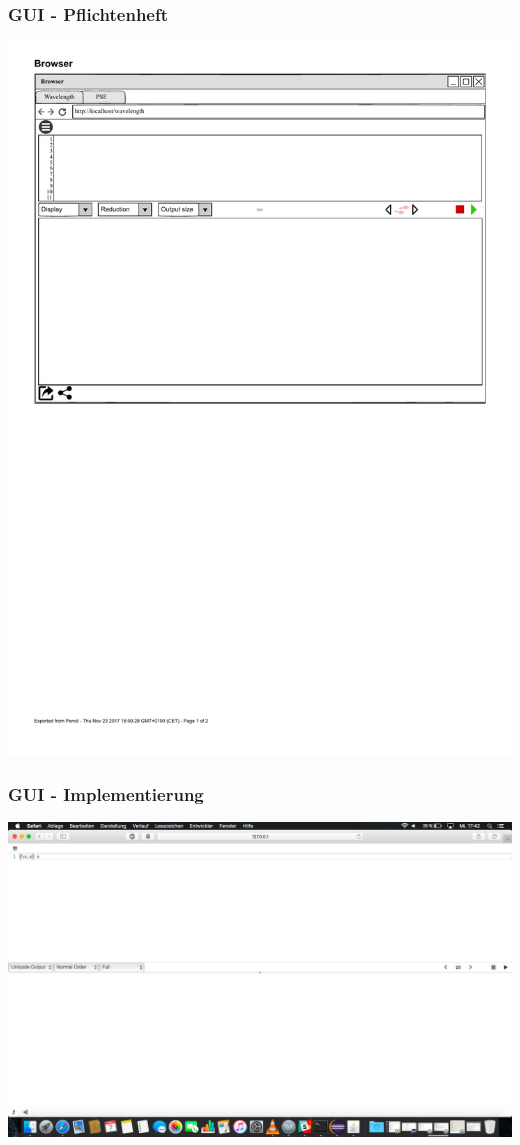 \documentclass[10pt]{beamer}
\begin{document}
\begin{frame}
\frametitle{GUI - \alert{Pflichtenheft}}
\includegraphics[scale=0.55]{img/startseite.pdf}
\end{frame}

\begin{frame}
\frametitle{GUI - \alert{Implementierung}}
\hspace*{-1cm}
\includegraphics[trim={0, 2.2cm, 0, 0}, clip, scale=0.25]{img/GUI2.png}
\end{frame}
\end{document}
